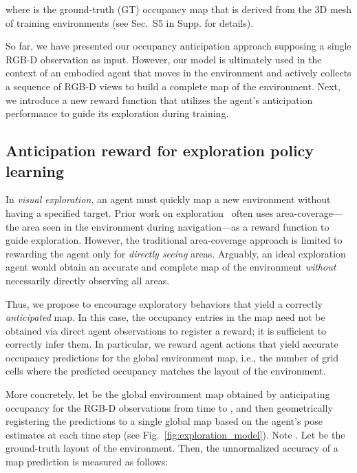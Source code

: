 \documentclass[runningheads]{llncs}
\begin{document}
where  is the ground-truth (GT) occupancy map that is derived from the 3D mesh of training environments (see Sec.~S5 in Supp. for details).  

So far, we have presented our occupancy anticipation approach supposing a single RGB-D observation as input. However, our model is ultimately used in the context of an embodied agent that moves in the environment and actively collects a sequence of RGB-D views to build a complete map of the environment. Next, we introduce a new reward function that utilizes the agent's anticipation performance to guide its exploration during training.


\subsection{Anticipation reward for exploration policy learning}
\label{sec:anticipation_reward}

In \emph{visual exploration}, an agent must quickly map a new environment without having a specified target. Prior work on exploration~\cite{chen2019learning,fang2019scene,chaplot2020learning,ramakrishnan2020exploration} often uses area-coverage---the area seen in the environment during navigation---as a reward function to guide exploration.  However, the traditional area-coverage approach is limited to rewarding the agent only for \emph{directly seeing} areas.  Arguably, an ideal exploration agent would obtain an accurate and complete map of the environment \emph{without} necessarily directly observing all areas.

Thus, we propose to encourage exploratory behaviors that yield a correctly \emph{anticipated} map. In this case, the occupancy entries in the map need not be obtained via direct agent observations to register a reward; it is sufficient to correctly infer them. In particular, we reward agent actions that yield accurate occupancy predictions for the global environment map, i.e., the number of grid cells where the predicted occupancy matches the layout of the environment.

More concretely, let  be the global environment map obtained by anticipating occupancy for the RGB-D observations  from time  to , and then geometrically registering the predictions to a single global map based on the agent's pose estimates at each time step (see Fig.~\ref{fig:exploration_model}). Note . Let  be the ground-truth layout of the environment. Then, the unnormalized accuracy of a map prediction  is measured as follows: 
  
\end{document}
